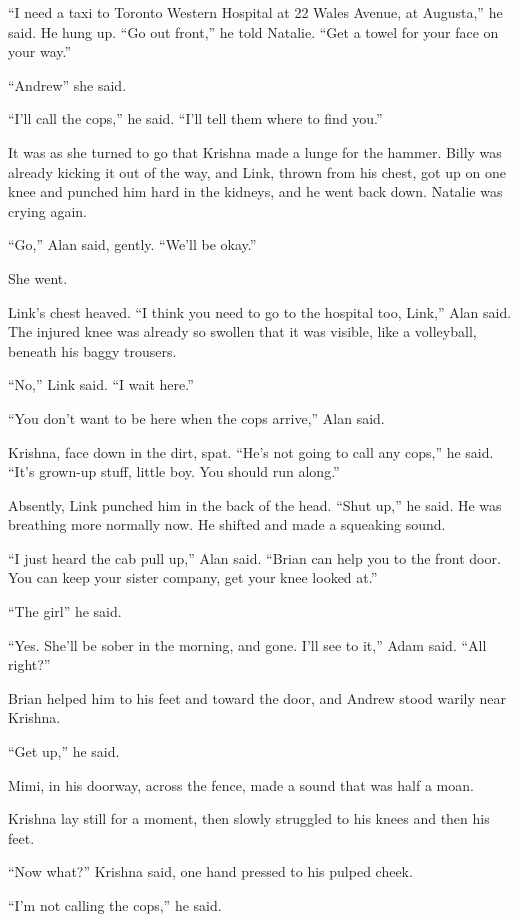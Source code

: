 ``I need a taxi to Toronto Western Hospital at 22 Wales Avenue, at
Augusta,'' he said.  He hung up.  ``Go out front,'' he told Natalie. 
``Get a towel for your face on your way.''

``Andrew\dash{}'' she said. 

``I'll call the cops,'' he said.  ``I'll tell them where to find
you.''

It was as she turned to go that Krishna made a lunge for the hammer. 
Billy was already kicking it out of the way, and Link, thrown from his
chest, got up on one knee and punched him hard in the kidneys, and he
went back down.  Natalie was crying again. 

``Go,'' Alan said, gently.  ``We'll be okay.''

She went.

Link's chest heaved.  ``I think you need to go to the hospital too,
Link,'' Alan said.  The injured knee was already so swollen that it
was visible, like a volleyball, beneath his baggy trousers.

``No,'' Link said.  ``I wait here.''

``You don't want to be here when the cops arrive,'' Alan said.

Krishna, face down in the dirt, spat.  ``He's not going to call any
cops,'' he said.  ``It's grown-up stuff, little boy.  You should run
along.''

Absently, Link punched him in the back of the head.  ``Shut up,'' he
said.  He was breathing more normally now.  He shifted and made a
squeaking sound.

``I just heard the cab pull up,'' Alan said.  ``Brian can help you to
the front door.  You can keep your sister company, get your knee
looked at.''

``The girl\dash{}'' he said.

``Yes.  She'll be sober in the morning, and gone.  I'll see to it,''
Adam said.  ``All right?''

Brian helped him to his feet and toward the door, and Andrew stood
warily near Krishna.

``Get up,'' he said.

Mimi, in his doorway, across the fence, made a sound that was half a
moan.

Krishna lay still for a moment, then slowly struggled to his knees and
then his feet.

``Now what?'' Krishna said, one hand pressed to his pulped cheek.

``I'm not calling the cops,'' he said.

